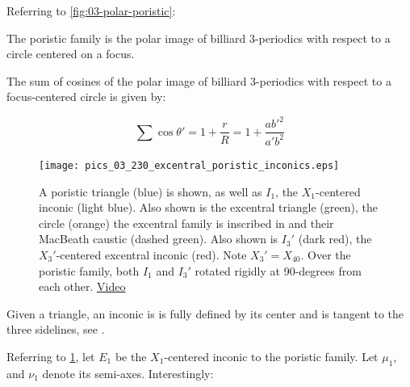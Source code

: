 
 
Referring to \cref{fig:03-polar-poristic}:

\begin{corollary}
The poristic family is the polar image of billiard 3-periodics with respect to a circle centered on a focus. 
\end{corollary}

\begin{corollary}
The sum of cosines of the polar image of billiard 3-periodics with respect to a focus-centered circle is given by:

\begin{equation}
\sum\cos\theta' = 1+\frac{r}{R} = 1+\frac{a b'^2}{a' b^2}
\label{eq:03-bic-cos}
\end{equation}
\end{corollary}

\begin{figure}
    \centering
    \texttt{[image: pics\_03\_230\_excentral\_poristic\_inconics.eps]}
    \caption{A poristic triangle (blue) is shown, as well as $I_1$, the $X_1$-centered inconic (light blue). Also shown is the excentral triangle (green), the circle (orange) the excentral family is inscribed in and their MacBeath caustic (dashed green). Also shown is $I_3'$ (dark red), the $X_3'$-centered excentral inconic (red). Note $X_3'=X_{40}$. Over the poristic family, both $I_1$ and $I_3'$ rotated rigidly at 90-degrees from each other. \href{https://youtu.be/hz0qEyVVvaI}{Video}}
    \label{fig:03-excentral-poristic-inconics}
\end{figure}

Given a triangle, an inconic is is fully defined by its center and is tangent to the three sidelines, see \cite[Inconic]{mw}.

Referring to \cref{fig:03-excentral-poristic-inconics}, let $E_1$ be the $X_1$-centered inconic to the poristic family. Let $\mu_1$, and $\nu_1$ denote its semi-axes. Interestingly:

